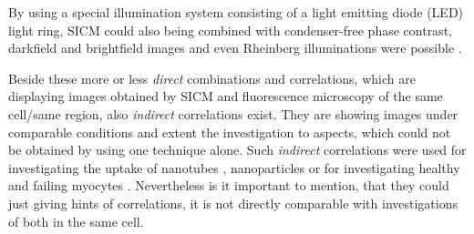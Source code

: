 By using a special illumination system consisting of a light emitting diode (LED) light ring, SICM 
could also being combined with condenser-free phase contrast, darkfield and brightfield images and 
even Rheinberg illuminations were possible \cite{Webb2014}.


Beside these more or less \emph{direct} combinations and correlations, which are displaying images 
obtained by SICM and fluorescence microscopy of the same cell/same region, also \emph{indirect} 
correlations exist. They are showing images under comparable conditions and extent the 
investigation to aspects, which could not be obtained by using one technique alone. Such 
\emph{indirect} correlations were used for investigating the uptake of nanotubes \cite{Lee2013}, 
nanoparticles \cite{Gesper2017} or for investigating healthy and failing myocytes \cite{Lyon2009}. 
Nevertheless is it important to mention, that they could just giving hints of correlations, it 
is not directly comparable with investigations of both in the same cell. 

